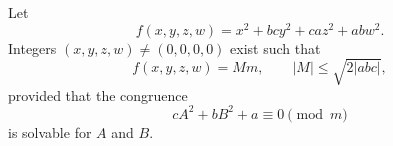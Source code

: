 \begin{proposition}
Let
\[
    f(x,y,z,w)=x^2+bcy^2+caz^2+abw^2.
\]
Integers $(x,y,z,w)\ne(0,0,0,0)$ exist such that
\[
    f(x,y,z,w)=Mm,\qquad |M|\le \sqrt{2|abc|},
\]
provided that the congruence
\[
    cA^2+bB^2+a\equiv0\pmod m
\]
is solvable for $A$ and $B$.
\end{proposition}
